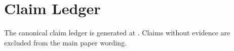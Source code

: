 \section{Claim Ledger}
The canonical claim ledger is generated at . Claims without evidence are excluded from the main paper wording.
